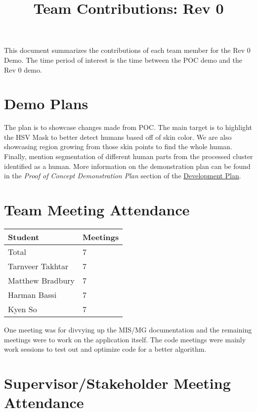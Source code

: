\documentclass{article}
\title{Team Contributions: Rev 0\\\progname}
\author{\authname}
\date{}
\begin{document}
\maketitle

This document summarizes the contributions of each team member for the Rev 0
Demo.  The time period of interest is the time between the POC demo and the Rev
0 demo.

\section{Demo Plans}

The plan is to showcase changes made from POC. The main target is to highlight the HSV Mask to better detect humans based off of skin color. We are also showcasing region growing from those skin points to find the whole human. 
Finally, mention segmentation of different human parts from the processed cluster identified as a human.  
More information on the demonstration plan can be found in the \textit{Proof of Concept Demonstration Plan} section of the \href{https://github.com/takhtart/PCD/blob/main/docs/DevelopmentPlan/DevelopmentPlan.pdf}{Development Plan}.


\section{Team Meeting Attendance}

\begin{table}[H]
\centering
\begin{tabular}{ll}
\toprule
\textbf{Student} & \textbf{Meetings}\\
\midrule
Total & 7\\
Tarnveer Takhtar & 7\\
Matthew Bradbury & 7\\
Harman Bassi & 7\\
Kyen So & 7\\
\bottomrule
\end{tabular}
\end{table}

One meeting was for divvying up the MIS/MG documentation and the remaining meetings were to work on the application itself.
The code meetings were mainly work sessions to test out and optimize code for a better algorithm. 

\section{Supervisor/Stakeholder Meeting Attendance}
\end{document}
